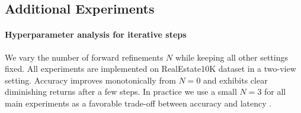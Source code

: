 \subsection{Additional Experiments}
\paragraph{Hyperparameter analysis for iterative steps}
\label{App:hyper}

We vary the number of forward refinements $N$ while keeping all other settings fixed. All experiments are implemented on RealEstate10K dataset in a two-view setting. 
Accuracy improves monotonically from $N{=}0$ and exhibits clear diminishing returns after a few steps. 
In practice we use a small $N=3$ for all main experiments as a favorable trade-off between accuracy and latency .



\begin{table}[htbp]
\centering
\footnotesize
\setlength{\tabcolsep}{3pt}
\renewcommand{\arraystretch}{1}
\caption{\textbf{Analysis of iterative steps.}  We report metrics as the number of refinement steps $T$ increases from the initial prediction, for both IFSplat and our GIFSplat. Performance improves steadily and saturates around 3 iterations.}
\label{tab:ablation}
\end{table}



